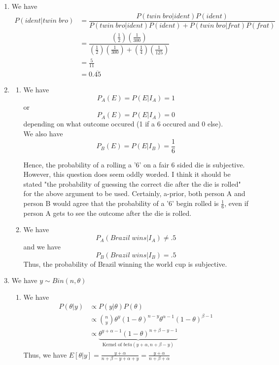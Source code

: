 \documentclass[12pt]{article}\usepackage[]{graphicx}\usepackage[]{color}
\newenvironment{knitrout}{}{} %
\begin{document}
\begin{enumerate}
\begin{enumerate}[label = (\alph*)]
\begin{knitrout}
{}



\end{knitrout}
\end{enumerate}
\item We have
\begin{align*}
P(ident | twin \; bro) &= \dfrac{P(twin \; bro | ident) P(ident)}{P(twin \; bro | ident)P(ident) + P(twin \; bro| frat)P(frat)}\\
&= \dfrac{(\frac{1}{2})(\frac{1}{300})}{(\frac{1}{2})(\frac{1}{300}) + (\frac{1}{4})(\frac{1}{125})}\\
&= \frac{5}{11}\\
&=0.  \overline{45}
\end{align*}
\item 
\begin{enumerate}[label=(\alph*)]
\item
We have
\[ P_A(E) = P(E|I_A) = 1\]
or
\[ P_A(E) = P(E|I_A) = 0\]
depending on what outcome occured (1 if a 6 occured and 0 else). \\

We also have
\[ P_B(E) = P(E|I_B) = \frac{1}{6}\]

Hence, the probability of a rolling a '6' on a fair 6 sided die is subjective. However, this question does seem oddly worded. I think it should be stated "the probability of guessing the correct die after the die is rolled" for the above argument to be used. Certainly, a-prior, both person A and person B would agree that the probability of a '6' begin rolled is $\frac{1}{6}$, even if person A gets to see the outcome after the die is rolled.
\item
We have
\[ P_A(Brazil \; wins|I_A) \neq .5 \]
and we have
\[ P_B(Brazil \; wins|I_B) = .5 \]
Thus, the probability of Brazil winning the world cup is subjective.
\end{enumerate}
\item We have $y \sim Bin(n, \theta)$
\begin{enumerate}[label = (\alph*), start = 2]
\item We have
\begin{align*}
P(\theta | y) &\propto P(y | \theta) P(\theta)\\
& \propto { n \choose y} \theta^y(1 - \theta)^{n- y} \theta^{\alpha - 1} (1 - \theta)^{\beta - 1}\\
& \propto \underbrace{\theta^{y + \alpha - 1} (1 - \theta)^{n + \beta - y - 1}}_{\text{Kernel of } beta(y+ \alpha, n + \beta - y)}
\end{align*}
Thus, we have $E[ \theta | y] = \frac{ y + \alpha}{n + \beta - y + \alpha + y} = \frac{ y + \alpha}{n + \beta + \alpha}$\\


\end{enumerate}
\end{enumerate}
\end{document}
